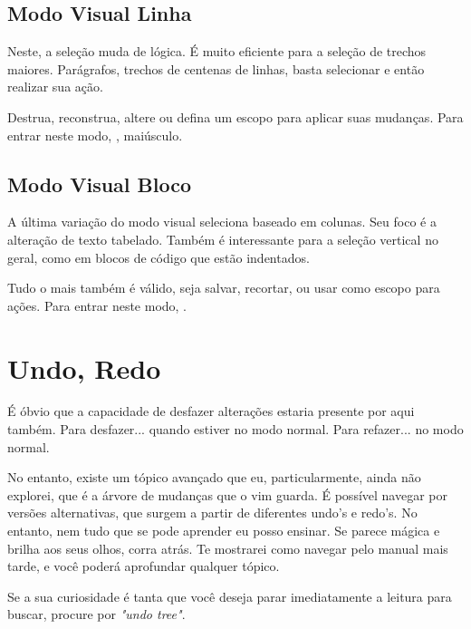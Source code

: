 
\subsection{Modo Visual Linha}
Neste, a seleção muda de lógica.
É muito eficiente para a seleção de trechos maiores.
Parágrafos, trechos de centenas de linhas, basta selecionar e então realizar sua ação.


Destrua, reconstrua, altere ou defina um escopo para aplicar suas mudanças.
Para entrar neste modo, , maiúsculo.

\subsection{Modo Visual Bloco}
A última variação do modo visual seleciona baseado em colunas.
Seu foco é a alteração de texto tabelado.
Também é interessante para a seleção vertical no geral, como em blocos de código que estão indentados.

Tudo o mais também é válido, seja salvar, recortar, ou usar como escopo para ações.
Para entrar neste modo, .


\section{Undo, Redo}
É óbvio que a capacidade de desfazer alterações estaria presente por aqui também.
Para desfazer...  quando estiver no modo normal.
Para refazer...  no modo normal.

No entanto, existe um tópico avançado que eu, particularmente, ainda não explorei, que é a árvore de mudanças que o vim guarda.
É possível navegar por versões alternativas, que surgem a partir de diferentes undo's e redo's.
No entanto, nem tudo que se pode aprender eu posso ensinar.
Se parece mágica e brilha aos seus olhos, corra atrás.
Te mostrarei como navegar pelo manual mais tarde, e você poderá aprofundar qualquer tópico.

Se a sua curiosidade é tanta que você deseja parar imediatamente a leitura para buscar, procure por \textit{"undo tree"}.

